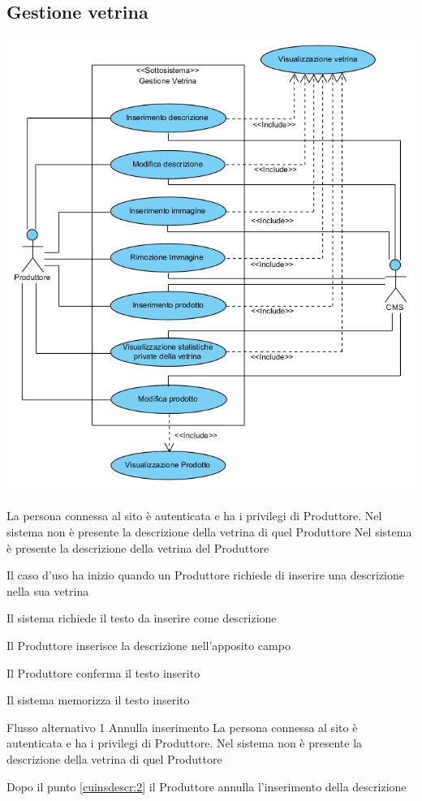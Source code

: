 \subsection{Gestione vetrina}
\begin{center}
   \includegraphics[width=\textwidth]{assets/visualParadigm/GestioneVentrina}
\end{center}
{}
{La persona connessa al sito è autenticata e ha i privilegi di Produttore. Nel sistema non è presente la descrizione della vetrina di quel Produttore}
{Nel sistema è presente la descrizione della vetrina del Produttore}
{\begin{enumCU}
		\item Il caso d'uso ha inizio quando un Produttore richiede di inserire una descrizione nella sua vetrina
		\item Il sistema richiede il testo da inserire come descrizione 
		\item Il Produttore inserisce la descrizione nell'apposito campo \label{cuinsdescr:2}
		\item Il Produttore conferma il testo inserito
		\item Il sistema memorizza il testo inserito
	\end{enumCU}}
%
{Flusso alternativo 1}%
{Annulla inserimento}%
{La persona connessa al sito è autenticata e ha i privilegi di Produttore. Nel sistema non è presente la descrizione della vetrina di quel Produttore}%
{\postNulle}%
{\begin{enumCU}
		\item Dopo il punto \ref{cuinsdescr:2} il Produttore annulla l'inserimento della descrizione
	\end{enumCU}}%

